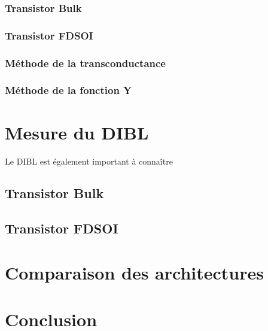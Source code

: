\documentclass[a4paper,11pt]{report}
\begin{document}
\subsection{Transistor Bulk}

\subsection{Transistor FDSOI}



\subsection{Méthode de la transconductance}


\subsection{Méthode de la fonction Y}

\chapter{Mesure du DIBL}
Le DIBL est également important à connaître %
\section{Transistor Bulk}

\section{Transistor FDSOI}

\chapter{Comparaison des architectures}

\chapter*{Conclusion}
\end{document}
